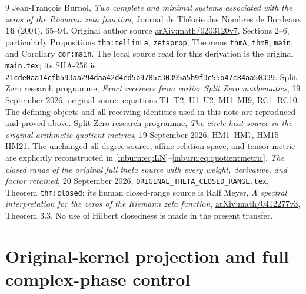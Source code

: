 \begin{thebibliography}{9}
 Jean-Fran\c{c}ois Burnol,
\emph{Two complete and minimal systems associated with the zeros
of the Riemann zeta function}, Journal de Th\'eorie des Nombres
de Bordeaux \textbf{16} (2004), 65--94.
Original author source \href{https://arxiv.org/abs/math/0203120v7}
{arXiv:math/0203120v7}, Sections 2--6, particularly
Propositions \texttt{thm:mellinLa}, \texttt{zetaprop},
Theorems \texttt{thmA}, \texttt{thmB}, \texttt{main}, and
Corollary \texttt{cor:main}. The local source read for this
derivation is the original \texttt{main.tex}; its SHA-256 is
\texttt{21cde0aa14cfb593aa294daa42d4ed5b9785c30395a5b9f3c55b47c84aa50339}.
 Split-Zero research programme,
\emph{Exact receivers from earlier Split Zero mathematics},
19 September 2026, original-source equations T1--T2, U1--U2,
MI1--MI9, RC1--RC10. The defining objects and all receiving
identities used in this note are reproduced and proved above.
 Split-Zero research programme,
\emph{The circle heat source in the original arithmetic quotient
metrics}, 19 September 2026, HM1--HM7, HM15--HM21.
The unchanged all-degree source, affine relation space, and
tensor metric are explicitly reconstructed in
\eqref{mburn:eq:LN}--\eqref{mburn:eq:quotientmetric}.
 \emph{The closed range of the original full
theta source with every weight, derivative, and factor retained},
20 September 2026, \texttt{ORIGINAL\_THETA\_CLOSED\_RANGE.tex},
Theorem \texttt{thm:closed}; its human closed-range source is
Ralf Meyer, \emph{A spectral interpretation for the zeros of the
Riemann zeta function}, \href{https://arxiv.org/abs/math/0412277v3}
{arXiv:math/0412277v3}, Theorem 3.3. No use of Hilbert closedness
is made in the present transfer.
\end{thebibliography}

\endgroup

\clearpage\begingroup
\part*{Original-kernel projection and full complex-phase control}
\newcommand{\mprojC}{\mathbb C}
\newcommand{\mprojim}{\operatorname{im}}
\newcommand{\mprojdiag}{\operatorname{diag}}
\newcommand{\mprojrank}{\operatorname{rank}}



